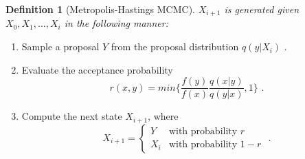 \documentclass[
  12pt,
  twoside]{book}
\theoremstyle{definition}
\newtheorem{definition}{Definition}[chapter]
\theoremstyle{definition}
\theoremstyle{definition}
\theoremstyle{remark}
\begin{document}
\begin{definition}[Metropolis-Hastings MCMC]
\protect\hypertarget{def:methas}{}{\label{def:methas} {} }\emph{\(X_{i+1}\) is generated given \(X_{0},X_{1},...,X_{i}\) in the following manner:}

\begin{enumerate}
  \item Sample a proposal $Y$ from the proposal distribution $q(y|X_{i}) \textrm{ .}$
  \item Evaluate the acceptance probability $$ r(x,y)=min \{\frac{f(y)}{f(x)} \frac{q(x|y)}{q(y|x)} ,1 \} \textrm{ .}$$
  \item Compute the next state $X_{i+1}$, where $$X_{i+1}=\begin{cases}Y & \textrm{with probability }r \\ X_{i} & \textrm{with probability }1-r \end{cases} \textrm{ .}$$
\end{enumerate}
\end{definition}
\end{document}
